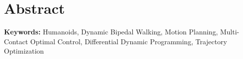\thispagestyle{empty}
\chapter*{Abstract}

\textbf{Keywords:} Humanoids, Dynamic Bipedal Walking, Motion Planning, Multi-Contact Optimal Control, Differential Dynamic Programming, Trajectory Optimization
 











